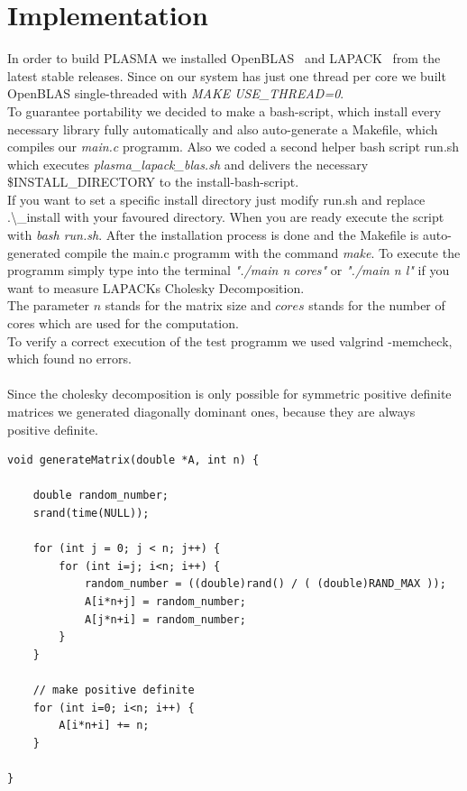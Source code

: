 \documentclass[a4paper,final,ngerman,english]{article}
\begin{document}
\section{Implementation}

In order to build PLASMA we installed OpenBLAS~\cite{openblas01} and LAPACK~\cite{lawn20} from the latest stable releases.
Since on our system has just one thread per core we built OpenBLAS single-threaded with \textit{MAKE USE\_THREAD=0}.\\
To guarantee portability we decided to make a bash-script, which install every necessary library fully automatically and also auto-generate a Makefile, which compiles our \textit{main.c} programm.
Also we coded a second helper bash script {run.sh} which executes \textit{plasma\_lapack\_blas.sh} and delivers the necessary \$INSTALL\_DIRECTORY to the install-bash-script.\\
If you want to set a specific install directory just modify run.sh and replace {.\textbackslash\_install} with your favoured directory.
When you are ready execute the script with \textit{bash run.sh}.
After the installation process is done and the Makefile is auto-generated compile the main.c programm with the command \textit{make}.
To execute the programm simply type into the terminal \textit{"./main n cores"} or \textit{"./main n l"} if you want to measure LAPACKs Cholesky Decomposition.\\ The parameter $n$ stands for the matrix size and $cores$ stands for the number of cores which are used for the computation.\\
To verify a correct execution of the test programm we used valgrind -memcheck, which found no errors.\\
\ \\Since the cholesky decomposition is only possible for symmetric positive definite matrices we generated diagonally dominant ones, because they are always positive definite.
\begin{lstlisting}
void generateMatrix(double *A, int n) {

	double random_number;
	srand(time(NULL));

	for (int j = 0; j < n; j++) {
		for (int i=j; i<n; i++) {
			random_number = ((double)rand() / ( (double)RAND_MAX ));
			A[i*n+j] = random_number;
			A[j*n+i] = random_number;
		}
	}

	// make positive definite
	for (int i=0; i<n; i++) {
		A[i*n+i] += n;
	}

}
\end{lstlisting}
\end{document}
